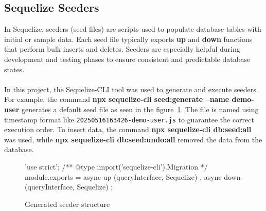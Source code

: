 \documentclass[a4paper,12pt]{report}
\begin{document}
\subsection{Sequelize Seeders}
In Sequelize, seeders (seed files) are scripts used to populate database tables with initial or sample data. Each seed file typically exports \textbf{up} and \textbf{down} functions that perform bulk inserts and deletes. Seeders are especially helpful during development and testing phases to ensure consistent and predictable database states. \parencite{sequelizemigrations}\\\\
In this project, the Sequelize-CLI tool was used to generate and execute seeders. For example, the command \textbf{npx sequelize-cli seed:generate --name demo-user} generates a default seed file as seen in the figure~\ref{fig:generated_seeder}. The file is named using timestamp format like \texttt{20250516163426-demo-user.js} to guarantee the correct execution order. To insert data, the command \textbf{npx sequelize-cli db:seed:all} was used, while \textbf{npx sequelize-cli db:seed:undo:all} removed the data from the database.
\begin{figure}[H]
	\begin{code}
		'use strict';
		/** @type {import('sequelize-cli').Migration} */
		module.exports = {
			async up (queryInterface, Sequelize) {
			},
			async down (queryInterface, Sequelize) {
			}
		};
	\end{code}
	\caption{Generated seeder structure}
	\label{fig:generated_seeder}
\end{figure}
\end{document}
